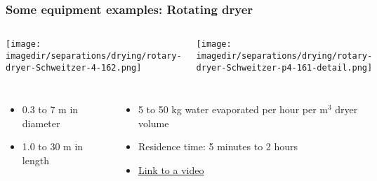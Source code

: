 \begin{frame}\frametitle{Some equipment examples: Rotating dryer}
	\begin{columns}[t]
			\begin{center}
				\texttt{[image: \\imagedir/separations/drying/rotary-dryer-Schweitzer-4-162.png]}
			\end{center}
			\begin{center}
				\texttt{[image: \\imagedir/separations/drying/rotary-dryer-Schweitzer-p4-161-detail.png]}
			\end{center}
	\end{columns}

	\begin{columns}[t]
			\begin{itemize}
				\item	0.3 to 7 m in diameter
				\item	1.0 to 30 m in length
			\end{itemize}
			\begin{itemize}
				\item	5 to 50 kg water evaporated per hour per m$^3$ dryer volume
				\item	Residence time: 5 minutes to 2 hours
				\item	\href{http://www.youtube.com/watch?v=eUVY-jzqis8}{Link to a video}
			\end{itemize}
			
	\end{columns}
\end{frame}

